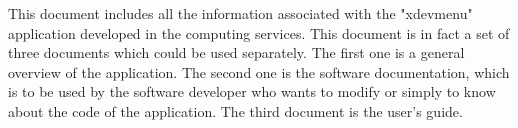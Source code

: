 %
%
%
%
%
%
%
%
%
%
This document includes all the information associated with the "xdevmenu"
application developed in the computing services. This document is in fact a
set of three documents which could be used separately. The first one is a
general overview of the application. The second one is the software
documentation, which is to be used by the software developer who
wants to modify or simply to know about the code of the application. The third
document is the user's guide.
